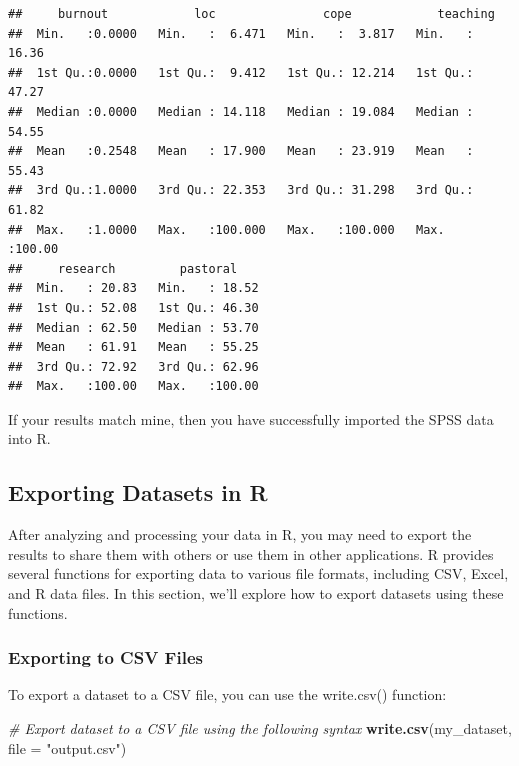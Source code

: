 \documentclass[
]{book}
\newenvironment{Shaded}{\begin{snugshade}}{\end{snugshade}}
\newcommand{\AttributeTok}[1]{\textcolor[rgb]{0.13,0.29,0.53}{#1}}
\newcommand{\CommentTok}[1]{\textcolor[rgb]{0.56,0.35,0.01}{\textit{#1}}}
\newcommand{\FunctionTok}[1]{\textcolor[rgb]{0.13,0.29,0.53}{\textbf{#1}}}
\newcommand{\NormalTok}[1]{#1}
\newcommand{\StringTok}[1]{\textcolor[rgb]{0.31,0.60,0.02}{#1}}
\begin{document}
\begin{verbatim}
##     burnout            loc               cope            teaching     
##  Min.   :0.0000   Min.   :  6.471   Min.   :  3.817   Min.   : 16.36  
##  1st Qu.:0.0000   1st Qu.:  9.412   1st Qu.: 12.214   1st Qu.: 47.27  
##  Median :0.0000   Median : 14.118   Median : 19.084   Median : 54.55  
##  Mean   :0.2548   Mean   : 17.900   Mean   : 23.919   Mean   : 55.43  
##  3rd Qu.:1.0000   3rd Qu.: 22.353   3rd Qu.: 31.298   3rd Qu.: 61.82  
##  Max.   :1.0000   Max.   :100.000   Max.   :100.000   Max.   :100.00  
##     research         pastoral     
##  Min.   : 20.83   Min.   : 18.52  
##  1st Qu.: 52.08   1st Qu.: 46.30  
##  Median : 62.50   Median : 53.70  
##  Mean   : 61.91   Mean   : 55.25  
##  3rd Qu.: 72.92   3rd Qu.: 62.96  
##  Max.   :100.00   Max.   :100.00
\end{verbatim}

If your results match mine, then you have successfully imported the SPSS data into R.

\hypertarget{exporting-datasets-in-r}{%
\subsection{Exporting Datasets in R}\label{exporting-datasets-in-r}}

After analyzing and processing your data in R, you may need to export the results to share them with others or use them in other applications. R provides several functions for exporting data to various file formats, including CSV, Excel, and R data files. In this section, we'll explore how to export datasets using these functions.

\hypertarget{exporting-to-csv-files}{%
\subsubsection{Exporting to CSV Files}\label{exporting-to-csv-files}}

To export a dataset to a CSV file, you can use the write.csv() function:

\begin{Shaded}
\begin{Highlighting}[]
\CommentTok{\# Export dataset to a CSV file using the following syntax}
\FunctionTok{write.csv}\NormalTok{(my\_dataset, }\AttributeTok{file =} \StringTok{"output.csv"}\NormalTok{)}
\end{Highlighting}
\end{Shaded}
\end{document}
